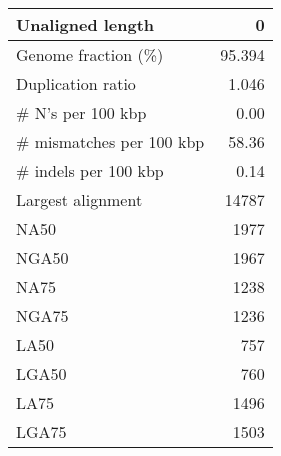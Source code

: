 \documentclass[12pt,a4paper]{article}
\begin{document}
\begin{table}[ht]
\begin{center}
\begin{tabular}{|l*{1}{|r}|}
Unaligned length & 0 \\ \hline
Genome fraction (\%) & 95.394 \\ \hline
Duplication ratio & 1.046 \\ \hline
\# N's per 100 kbp & 0.00 \\ \hline
\# mismatches per 100 kbp & 58.36 \\ \hline
\# indels per 100 kbp & 0.14 \\ \hline
Largest alignment & 14787 \\ \hline
NA50 & 1977 \\ \hline
NGA50 & 1967 \\ \hline
NA75 & 1238 \\ \hline
NGA75 & 1236 \\ \hline
LA50 & 757 \\ \hline
LGA50 & 760 \\ \hline
LA75 & 1496 \\ \hline
LGA75 & 1503 \\ \hline
\end{tabular}
\end{center}
\end{table}
\end{document}
